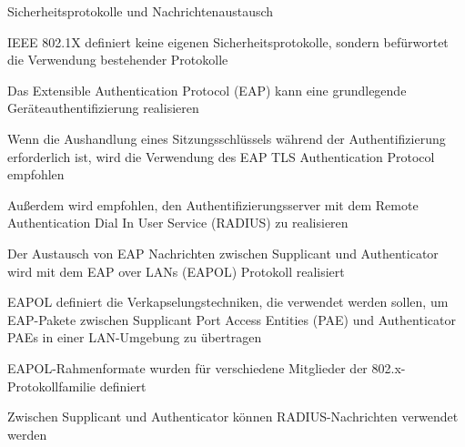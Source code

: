 \documentclass[a4paper]{article}
\begin{document}
\begin{multicols}{3}
      Sicherheitsprotokolle und Nachrichtenaustausch
      \begin{itemize*}
            \item IEEE 802.1X definiert keine eigenen Sicherheitsprotokolle, sondern befürwortet die Verwendung bestehender Protokolle
            \begin{itemize*}
                  \item Das Extensible Authentication Protocol (EAP) kann eine grundlegende Geräteauthentifizierung realisieren
                  \item Wenn die Aushandlung eines Sitzungsschlüssels während der Authentifizierung erforderlich ist, wird die Verwendung des EAP TLS Authentication Protocol empfohlen
                  \item Außerdem wird empfohlen, den Authentifizierungsserver mit dem Remote Authentication Dial In User Service (RADIUS) zu realisieren
            \end{itemize*}
            \item Der Austausch von EAP Nachrichten zwischen Supplicant und Authenticator wird mit dem EAP over LANs (EAPOL) Protokoll realisiert
            \begin{itemize*}
                  \item EAPOL definiert die Verkapselungstechniken, die verwendet werden sollen, um EAP-Pakete zwischen Supplicant Port Access Entities (PAE) und Authenticator PAEs in einer LAN-Umgebung zu übertragen
                  \item EAPOL-Rahmenformate wurden für verschiedene Mitglieder der 802.x-Protokollfamilie definiert%
                  \item Zwischen Supplicant und Authenticator können RADIUS-Nachrichten verwendet werden
            \end{itemize*}
      \end{itemize*}



\end{multicols}
\end{document}
